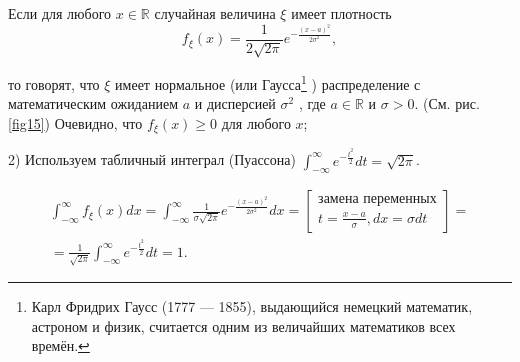 \begin{definition}
 \label{def:12.8}
Если для любого $x \in \mathbb{R}$ случайная величина $\xi$ имеет плотность
\begin{equation*}
	f_{\xi}(x) = \frac{1}{2 \sqrt{2\pi}}e^{-\frac{(x-a)^2}{2\sigma^2}},
\end{equation*}

то говорят, что $\xi$ имеет нормальное (или Гаусса\footnote{
Карл Фридрих Гаусс (1777 — 1855), выдающийся немецкий математик,
астроном и физик, считается одним из величайших математиков всех времён.	
} 
) распределение с математическим ожиданием $a$ и дисперсией $\sigma^2$ , где $a \in \mathbb{R}$ и $\sigma > 0$. (См. рис. \ref{fig15}) Очевидно, что $f_{\xi}(x) \geq 0$ для любого $x$;

2) Используем табличный интеграл (Пуассона)
$\int_{-\infty}^{\infty}e^{-\frac{t^2}{2}}dt=\sqrt{2\pi}$.

\begin{gather*}
	\int_{-\infty}^{\infty} f_{\xi}(x)dx = \int_{-\infty}^{\infty} \frac{1}{\sigma \sqrt{2\pi}}e^{-\frac{(x-a)^2}{2\sigma^2}}dx =
	\left[
	\begin{aligned}
		\text{замена переменных}\\
		t = \frac{x-a}{\sigma}, dx = \sigma dt
	\end{aligned}\right]=\\=
	\frac{1}{\sqrt{2\pi}}\int_{-\infty}^{\infty}e^{-\frac{t^2}{2}}dt=1.
\end{gather*}
\end{definition}

